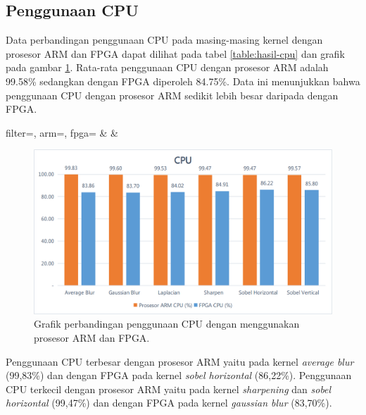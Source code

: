 \subsection{Penggunaan CPU}
Data perbandingan penggunaan CPU pada masing-masing kernel dengan prosesor ARM dan FPGA dapat dilihat pada tabel \ref{table:hasil-cpu} dan grafik pada gambar \ref{fig:chart-cpu}. Rata-rata penggunaan CPU dengan prosesor ARM adalah 99.58\% sedangkan dengan FPGA diperoleh 84.75\%. Data ini menunjukkan bahwa penggunaan CPU dengan prosesor ARM sedikit lebih besar daripada dengan FPGA.

\begin{atable}
    \caption{Tabel perbandingan penggunaan CPU dengan menggunakan prosesor ARM dan FPGA.}
    \label{table:hasil-cpu}
        {
            filter=\filter, 
            arm=\arm, 
            fpga=\fpga}
        {
            \filter & 
            \arm & 
            \fpga }
\end{atable}
\begin{figure}[H]
    \includegraphics[width=0.81\linewidth, center]{images/chart/chart-cpu.png}
    \caption{Grafik perbandingan penggunaan CPU dengan menggunakan prosesor ARM dan FPGA.}
    \label{fig:chart-cpu}
\end{figure}


Penggunaan CPU terbesar dengan prosesor ARM yaitu pada kernel \textit{average blur} (99,83\%) dan dengan FPGA pada kernel \textit{sobel horizontal} (86,22\%). Penggunaan CPU terkecil dengan prosesor ARM yaitu pada kernel \textit{sharpening} dan \textit{sobel horizontal} (99,47\%) dan dengan FPGA pada kernel \textit{gaussian blur} (83,70\%).

